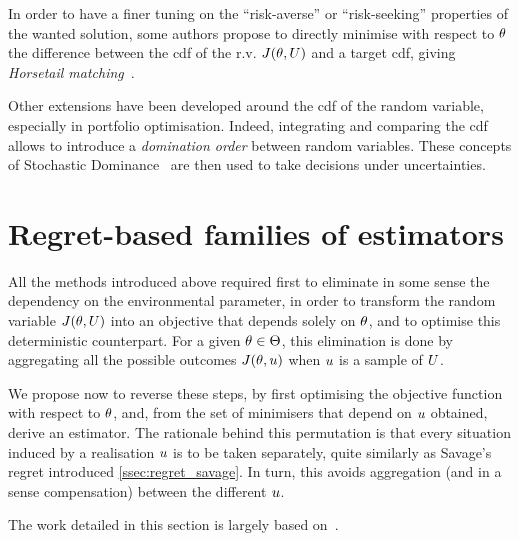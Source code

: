 \documentclass[../../Main_ManuscritThese.tex]{subfiles}
\newcommand\imgpath{/home/victor/acadwriting/Manuscrit/Text/Chapter3/img/}
\begin{document}
In order to have a finer tuning on the ``risk-averse'' or
``risk-seeking'' properties of the wanted solution, some authors
propose to directly minimise with respect to $\theta$ the difference
between the cdf of the r.v. $J(\theta, U)$ and a target cdf, giving
\emph{Horsetail
  matching}~\cite{cook_extending_2017,cook_effective_2018}.

Other extensions have been developed around the cdf of the random
variable, especially in portfolio optimisation. Indeed, integrating
and comparing the cdf allows to introduce a \emph{domination order}
between random variables. These concepts of Stochastic
Dominance~\cite{ogryczak_stochastic_1997} are then used to take
decisions under uncertainties.


\section{Regret-based families of estimators}
\label{sec:rr_family}
All the methods introduced above required first to eliminate in some
sense the dependency on the environmental parameter, in order to
transform the random variable $J(\theta, U)$ into an objective that
depends solely on $\theta$, and to optimise this deterministic
counterpart.  For a given $\theta\in\Theta$, this elimination is done by
aggregating all the possible outcomes $J(\theta, u)$ when $u$ is a
sample of $U$.


We propose now to reverse these steps, by first optimising the
objective function with respect to $\theta$, and, from the set of
minimisers that depend on $u$ obtained, derive an estimator. The
rationale behind this permutation is that every situation induced by a
realisation $u$ is to be taken separately, quite similarly as
Savage's regret introduced \cref{ssec:regret_savage}.  In turn, this
avoids aggregation (and in a sense compensation) between the different
$u$.

The work detailed in this section is largely based
on~\cite{trappler_robust_2020}.

%   
\end{document}
